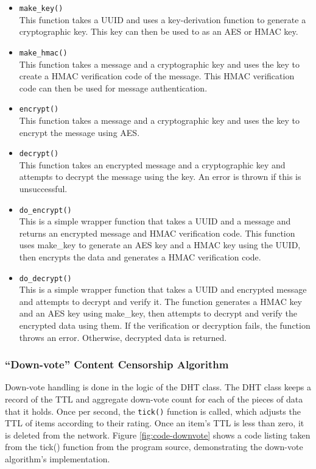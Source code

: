 \begin{itemize}
	\item {\texttt{make\_key()} \\
	This function takes a UUID and uses a key-derivation function to generate a cryptographic key.
	This key can then be used to as an AES or HMAC key.
	}
	\item {\texttt{make\_hmac()}\\
	This function takes a message and a cryptographic key and uses the key to create a HMAC verification code of
	the message. This HMAC verification code can then be used for message authentication.
	}
	\item {\texttt{encrypt()}\\
	This function takes a message and a cryptographic key and uses the key to encrypt the message using AES.
	}
	\item {\texttt{decrypt()}\\
	This function takes an encrypted message and a cryptographic key and attempts to decrypt the message using the key.
	An error is thrown if this is unsuccessful.
	}
	\item {\texttt{do\_encrypt()}\\
	This is a simple wrapper function that takes a UUID and a message and returns an encrypted message and HMAC verification code. This function uses
	make\_key to generate an AES key and a HMAC key using the UUID, then encrypts the data and generates a HMAC verification code.
	}
	\item {\texttt{do\_decrypt()}\\
	This is a simple wrapper function that takes a UUID and encrypted message and attempts to decrypt and verify it.
	The function generates a HMAC key and an AES key using make\_key, then attempts to decrypt and verify the encrypted data using them.
	If the verification or decryption fails, the function throws an error. Otherwise, decrypted data is returned.
	}

\end{itemize}

\subsubsection{``Down-vote'' Content Censorship Algorithm}

Down-vote handling is done in the logic of the DHT class. The DHT class keeps a record of the TTL and aggregate down-vote count for each of the pieces of
data that it holds. Once per second, the \texttt{tick()} function is called, which adjusts the TTL of items according to their rating. Once an item's TTL
is less than zero, it is deleted from the network. Figure \ref{fig:code-downvote} shows a code listing taken from the tick() function from the
program source, demonstrating the down-vote algorithm's implementation.

